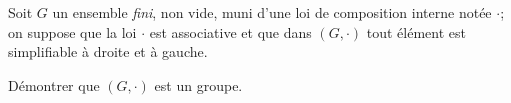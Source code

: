 Soit $G$ un ensemble \textit{fini}, non vide, muni d'une loi de composition interne notée $\cdot$; on suppose que la loi $\cdot$ est associative et que dans $(G,\cdot)$ tout élément est simplifiable
à droite et à gauche.

Démontrer que $(G,\cdot)$ est un groupe.